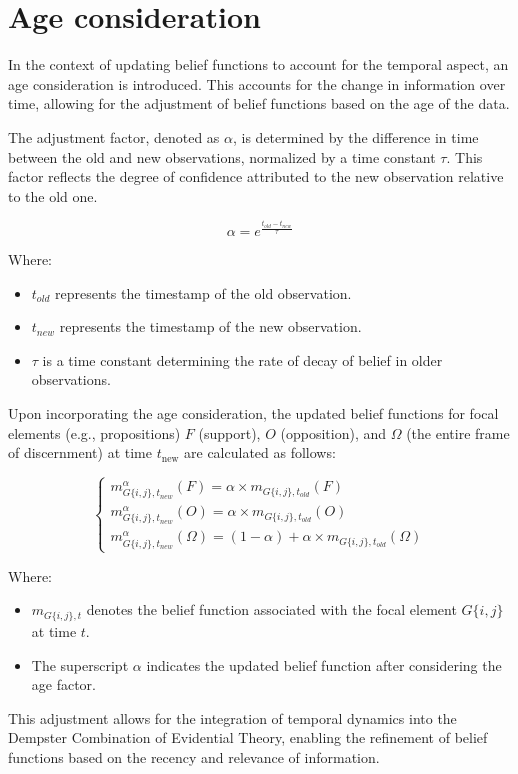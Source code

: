 
\section{Age consideration} \label{sec:age_consideration}

In the context of updating belief functions to account for the temporal aspect, an age consideration is introduced. This accounts for the change in information over time, allowing for the adjustment of belief functions based on the age of the data.

The adjustment factor, denoted as $ \alpha $, is determined by the difference in time between the old and new observations, normalized by a time constant $ \tau $. This factor reflects the degree of confidence attributed to the new observation relative to the old one.

$$
    \alpha = e^{\frac{t_{old}-t_{new}}{\tau}}
$$

Where:
\begin{itemize}
    \item $ t_{old} $ represents the timestamp of the old observation.
    \item $ t_{new} $ represents the timestamp of the new observation.
    \item $ \tau $ is a time constant determining the rate of decay of belief in older observations.
\end{itemize}

Upon incorporating the age consideration, the updated belief functions for focal elements (e.g., propositions) $F$ (support), $O$ (opposition), and $\Omega$ (the entire frame of discernment) at time $ t_{\text{new}} $ are calculated as follows:

$$
    \begin{cases}
        m_{G\{i,j\},t_{new}}^{\alpha}(F) = \alpha \times m_{G\{i,j\},t_{old}}(F) \\
        m_{G\{i,j\},t_{new}}^{\alpha}(O) = \alpha \times m_{G\{i,j\},t_{old}}(O) \\
        m_{G\{i, j\}, t_{new}}^{\alpha}(\Omega) = (1 - \alpha) + \alpha \times m_{G\{i, j\}, t_{old}}(\Omega)
    \end{cases}
$$


Where:
\begin{itemize}
    \item $m_{G\{i,j\},t}$ denotes the belief function associated with the focal element $ G\{i,j\} $ at time $ t $.
    \item The superscript $\alpha$ indicates the updated belief function after considering the age factor.
\end{itemize}


This adjustment allows for the integration of temporal dynamics into the Dempster Combination of Evidential Theory, enabling the refinement of belief functions based on the recency and relevance of information.